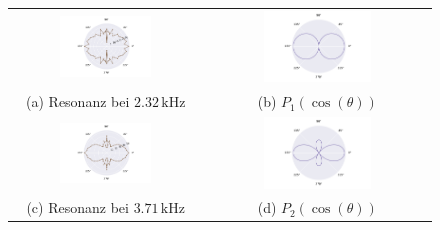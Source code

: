 \begin{figure}[H]
  \centering
  \begin{tabular}{cc}
    \includegraphics[width=0.5\textwidth]{Daten/Wasserstoff/neu/peak0.pdf} &   \includegraphics[width=0.5\textwidth]{Daten/Wasserstoff/peakLeg0.pdf} \\
  (a) Resonanz bei $2.32 \,\si{\kilo\hertz} $& (b) $P_1(\cos(\theta))$ \\[6pt]
  \includegraphics[width=0.5\textwidth]{Daten/Wasserstoff/neu/peak1.pdf} &   \includegraphics[width=0.5\textwidth]{Daten/Wasserstoff//peakLeg1.pdf} \\
  (c) Resonanz bei $3.71 \,\si{\kilo\hertz}$ & (d) $P_2(\cos(\theta))$ \\[6pt]

\end{tabular}
\end{figure}

